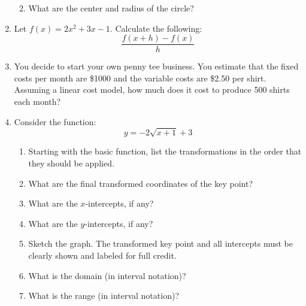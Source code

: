 \documentclass[letterpaper,12pt,fleqn]{article}
\begin{document}
\begin{enumerate}[left=0pt]
\begin{enumerate}
    \vspace{4in}
    
  \item What are the center and radius of the circle?
  \end{enumerate}

  \newpage

\item Let \(f(x)=2x^2+3x-1\).  Calculate the following:
  \[\frac{f(x+h)-f(x)}{h}\]

  \vspace{4in}

\item You decide to start your own penny tee business.  You estimate that the fixed costs per month are \$1000 and
  the variable costs are \$2.50 per shirt.  Assuming a linear cost model, how much does it cost to produce
  500 shirts each month?

  \newpage

\item Consider the function:
  \[y=-2\sqrt{x+1}+3\]
  \begin{enumerate}
  \item Starting with the basic function, list the transformations in the order that they should be applied.
    \vspace{2in}
  \item What are the final transformed coordinates of the key point?
    \vspace{2in}
  \item What are the \(x\)-intercepts, if any?
    \newpage
  \item What are the \(y\)-intercepts, if any?
    \vspace{1in}
  \item Sketch the graph.  The transformed key point and all intercepts must be clearly shown and labeled for
    full credit.

    \bigskip

    
    \bigskip

  \item What is the domain (in interval notation)?
    \vspace{1in}
  \item What is the range (in interval notation)?
  \end{enumerate}


\end{enumerate}
\end{document}
